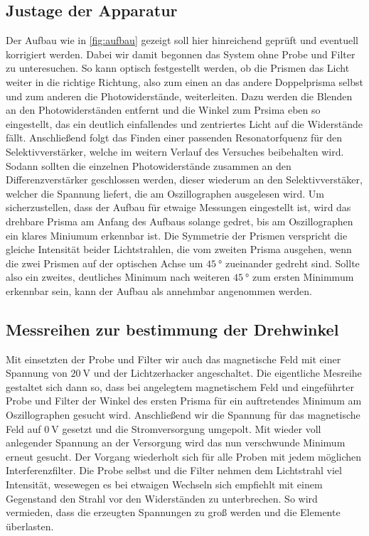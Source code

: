 \subsection{Justage der Apparatur}
Der Aufbau wie in \ref{fig:aufbau} gezeigt soll hier hinreichend geprüft und eventuell korrigiert werden.
Dabei wir damit begonnen das System ohne Probe und Filter zu unteresuchen. So kann optisch festgestellt werden, 
ob die Prismen das Licht weiter in die richtige Richtung, also zum einen an das andere Doppelprisma selbst und zum anderen die Photowiderstände, weiterleiten.
Dazu werden die Blenden an den Photowiderständen entfernt und die Winkel zum Prsima eben so eingestellt, das
ein deutlich einfallendes und zentriertes Licht auf die Widerstände fällt.
Anschließend folgt das Finden einer passenden Resonatorfquenz für den Selektivverstärker,
welche im weitern Verlauf des Versuches beibehalten wird. Sodann sollten die einzelnen Photowiderstände zusammen 
an den Differenzverstärker geschlossen werden, dieser wiederum an den Selektivverstäker,
welcher die Spannung liefert, die am Oszillographen ausgelesen wird. 
Um sicherzustellen, dass der Aufbau für etwaige Messungen eingestellt ist, wird das drehbare Prisma am Anfang des 
Aufbaus solange gedret, bis am Oszillographen ein klares Miniumum erkennbar ist. 
Die Symmetrie der Prismen verspricht die gleiche Intensität beider Lichtstrahlen, die vom zweiten 
Prisma ausgehen, wenn die zwei Prismen auf der optischen Achse um $\SI{45}{\degree}$
zueinander gedreht sind. Sollte also ein zweites, deutliches Minimum nach weiteren $\SI{45}{\degree}$ zum ersten Minimmum erkennbar sein,
kann der Aufbau als annehmbar angenommen werden.

\subsection{Messreihen zur bestimmung der Drehwinkel}
Mit einsetzten der Probe und Filter wir auch das magnetische Feld mit einer Spannung von
$\SI{20}{\volt}$ und der Lichtzerhacker angeschaltet. Die eigentliche Mesreihe gestaltet sich dann so,
dass bei angelegtem magnetischem Feld und eingeführter Probe und Filter der Winkel des ersten Prisma
für ein auftretendes Minimum am Oszillographen gesucht wird. 
Anschließend wir die Spannung für das magnetische Feld auf $\SI{0}{\volt}$ gesetzt
und die Stromversorgung umgepolt. Mit wieder voll anlegender Spannung an der Versorgung wird das nun verschwunde Minimum erneut gesucht.
Der Vorgang wiederholt sich für alle Proben mit jedem möglichen Interferenzfilter.
Die Probe selbst und die Filter nehmen dem Lichtstrahl viel Intensität, wesewegen es bei etwaigen 
Wechseln sich empfiehlt mit einem Gegenstand den Strahl vor den Widerständen zu unterbrechen.
So wird vermieden, dass die erzeugten Spannungen zu groß werden und die Elemente überlasten.

